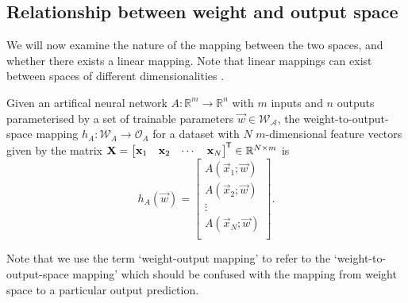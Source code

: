 \subsection{Relationship between weight and output space}
We will now examine the nature of the mapping between the two spaces, and whether there exists a linear mapping. 
Note that linear mappings can exist between spaces of different dimensionalities \cite{rudin2006}.

\begin{definition}
    \label{def:weight_output_space_mapping}
    Given an artifical neural network $A:\mathbb{R}^m \rightarrow \mathbb{R}^n$ with $m$ inputs and $n$ outputs parameterised by a set of trainable parameters $\vec{w} \in \mathcal{W_A}$,
    the weight-to-output-space mapping $h_A: \mathcal{W}_A \rightarrow \mathcal{O}_A$ for a dataset with $N$ $m$-dimensional feature vectors given by the matrix
    $\mathbf{X} = \begin{bmatrix}
        \mathbf{x}_1 & \mathbf{x}_2 & \cdots & \mathbf{x}_N
    \end{bmatrix}^{\mkern-1.5mu\mathsf{T}} \in \mathbb{R}^{N\times m}$
    is
    \begin{equation*}
        h_A \left( \vec{w} \right)
        = \begin{bmatrix}
            A(\vec{x}_1; \vec{w} ) \\
            A(\vec{x}_2; \vec{w} ) \\
            \vdots \\
            A(\vec{x}_N; \vec{w} ) \\
        \end{bmatrix}.
    \end{equation*}

    Note that we use the term `weight-output mapping' to refer to the `weight-to-output-space mapping' which should be confused with the mapping from weight space to a particular output prediction. 
\end{definition}

